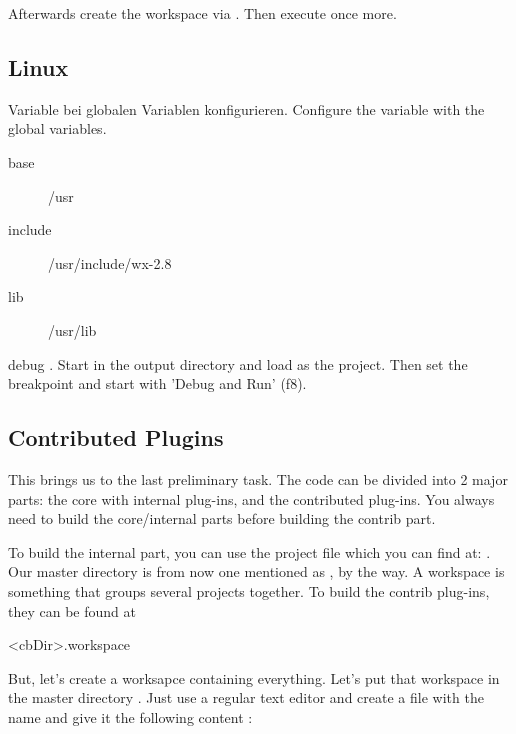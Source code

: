Afterwards create the workspace  via . Then execute  once more.

\subsection{Linux}

Variable  bei globalen Variablen konfigurieren.
Configure the  variable with the global variables.

\begin{description}
\item[base] /usr
\item[include] /usr/include/wx-2.8
\item[lib] /usr/lib
\end{description}

debug \codeblocks.
Start \codeblocks in the output directory and load  as the project. Then set the breakpoint and start with 'Debug and Run' (f8).

\subsection{Contributed Plugins}

This brings us to the last preliminary task. The \codeblocks code can be divided into 2 major parts: the core with internal plug-ins, and the contributed plug-ins. You always need to build the core/internal parts before building the contrib part.

To build the internal part, you can use the \codeblocks project file which you can find at: . Our \codeblocks master directory is from now one mentioned as , by the way. A workspace is something that groups several projects together. To build the contrib plug-ins, they can be found at

\begin{cmd}
<cbDir>\src\ContribPlugins.workspace
\end{cmd}


But, let's create a worksapce containing everything. Let's put that workspace in the master directory . Just use a regular text editor and create a file with the name  and give it the following content :

